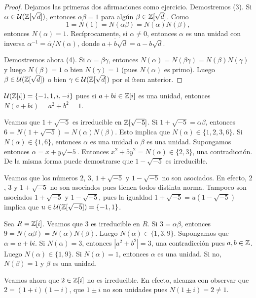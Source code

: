\begin{proof}
Dejamos las primeras dos afirmaciones como ejercicio. Demostremos (3). Si $\alpha\in\mathcal{U}(\mathbb{Z}[\sqrt{d}])$, 
entonces $\alpha\beta=1$ para algún $\beta\in\mathbb{Z}[\sqrt{d}]$. Como
\[
1=N(1)=N(\alpha\beta)=N(\alpha)N(\beta),
\]
entonces $N(\alpha)=1$. Recíprocamente, si $\alpha\ne0$, entonces $\alpha$ es una unidad con inversa
$\alpha^{-1}=\overline{\alpha}/N(\alpha)$, 
donde $\overline{a+b\sqrt{d}}=a-b\sqrt{d}$.

Demostremos ahora (4). Si $\alpha=\beta\gamma$, entonces $N(\alpha)=N(\beta\gamma)=N(\beta)N(\gamma)$ y luego
$N(\beta)=1$ o bien $N(\gamma)=1$ (pues $N(\alpha)$ es primo). Luego
$\beta\in\mathcal{U}(\mathbb{Z}[\sqrt{d}])$ o bien $\gamma\in\mathcal{U}(\mathbb{Z}[\sqrt{d}])$ por el ítem anterior.
\end{proof}

\begin{example}
$\mathcal{U}(\mathbb{Z}[i])=\{-1,1,i,-i\}$ pues si $a+bi\in\mathbb{Z}[i]$ es una unidad, entonces $N(a+bi)=a^2+b^2=1$. 	
\end{example}

\begin{example}
Veamos que $1+\sqrt{-5}$ es irreducible en $\mathbb{Z}[\sqrt{-5}]$. Si $1+\sqrt{-5}=\alpha\beta$, entonces 
$6=N(1+\sqrt{-5})=N(\alpha)N(\beta)$. Esto implica que $N(\alpha)\in\{1,2,3,6\}$. Si $N(\alpha)\in\{1,6\}$, entonces
$\alpha$ es una unidad o $\beta$ es una unidad. Supongamos entonces 
$\alpha=x+y\sqrt{-5}$. Entonces 
$x^2+5y^2=N(\alpha)\in\{2,3\}$, una contradicción. De la misma forma puede demostrarse que $1-\sqrt{-5}$ 
es irreducible. 

Veamos que los números 
$2$, $3$, $1+\sqrt{-5}$ y $1-\sqrt{-5}$ no son asociados. En efecto, $2$, $3$ y $1+\sqrt{-5}$ no son asociados
pues tienen todos distinta norma. Tampoco son asociados $1+\sqrt{-5}$ y $1-\sqrt{-5}$, pues la igualdad  
$1+\sqrt{-5}=u(1-\sqrt{-5})$ implica que $u\in\mathcal{U}(\mathbb{Z}[\sqrt{-5}])=\{-1,1\}$. 
\end{example}

\begin{example}
Sea $R=\mathbb{Z}[i]$. 
Veamos que $3$ es irreducible en $R$. Si $3=\alpha\beta$, entonces
$9=N(\alpha\beta)=N(\alpha)N(\beta)$. Luego $N(\alpha)\in\{1,3,9\}$. Supongamos que $\alpha=a+bi$. Si $N(\alpha)=3$, entonces $|a^2+b^2|=3$, una contradicción pues $a,b\in\mathbb{Z}$. Luego $N(\alpha)\in\{1,9\}$. Si $N(\alpha)=1$, entonces $\alpha$ es una unidad. Si no, $N(\beta)=1$ y $\beta$ es una unidad. 	

Veamos ahora que $2\in\mathbb{Z}[i]$ no es irreducible. En efecto, alcanza con observar que $2=(1+i)(1-i)$, que 
$1\pm i$ no son unidades pues $N(1\pm i)=2\ne 1$. 
\end{example}

